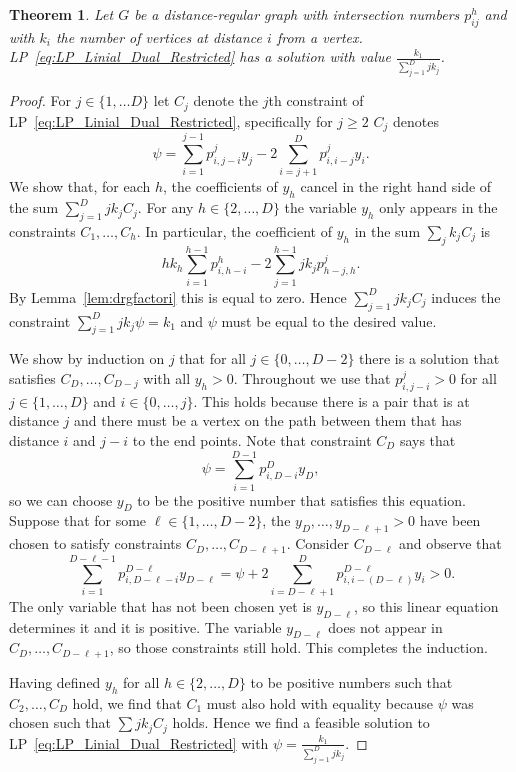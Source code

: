 \documentclass[a4paper,11pt]{article}
\newtheorem{theorem}{Theorem}[section]
\theoremstyle{definition}
\begin{document}
\begin{theorem}\label{thm:opt_lp_drg}
    Let $G$ be a distance-regular graph with intersection numbers $p_{ij}^h$ and with $k_i$ the number of vertices at distance $i$ from a vertex. LP~\eqref{eq:LP_Linial_Dual_Restricted} has a solution with value $\frac{k_1}{\sum_{j=1}^D jk_j}$.
\end{theorem}

\begin{proof}
    For $j \in \{1,\ldots D\}$ let $C_j$ denote the $j$th constraint of LP~\eqref{eq:LP_Linial_Dual_Restricted}, specifically for $j  \ge 2$ $C_j$ denotes
    $$\psi = \sum_{i=1}^{j-1} p_{i,j-i}^j y_j -2 \sum_{i=j+1}^{D} p_{i,i-j}^j y_i.$$
    We show that, for each $h$, the coefficients of $y_h$ cancel in the right hand side of the sum $\sum_{j = 1}^D jk_jC_j$. For any $h \in \{2,\ldots, D\}$ the variable $y_h$ only appears in the constraints $C_1,\ldots, C_h$. In particular, the coefficient of $y_h$ in the sum $\sum_jk_j C_j$ is $$hk_h\sum_{i = 1}^{h-1} p_{i,h-i}^h - 2\sum_{j = 1}^{h-1} jk_jp_{h-j,h}^j.$$ By Lemma~\ref{lem:drgfactori} this is equal to zero.  Hence $\sum_{j = 1}^D jk_jC_j$ induces the constraint $\sum_{j = 1}^D jk_j\psi = k_1$ and $\psi$ must be equal to the desired value. 
    
    We show by induction on $j$ that for all $j\in\{0,\dots,D-2\}$ there is a solution that satisfies $C_D,\ldots, C_{D-j}$ with all $y_h > 0$. Throughout we use that $p_{i,j-i}^j > 0$ for all \(j\in\{1,\dots,D\}\) and $i\in\{0,\dots,j\}$. This holds because there is a pair that is at distance $j$ and there must be a vertex on the path between them that has distance $i$ and $j-i$ to the end points. Note that constraint $C_D$ says that
    $$\psi = \sum_{i = 1}^{D-1} p_{i,D-i}^Dy_D,$$
    so we can choose $y_D$ to be the positive number that satisfies this equation. Suppose that for some $\ell\in\{1,\dots,D-2\}$, the $y_D,\ldots, y_{D-\ell+1} > 0$ have been chosen to satisfy constraints $C_D,\ldots, C_{D-\ell+1}$. Consider $C_{D-\ell}$ and observe that
    $$\sum_{i = 1}^{D-\ell-1} p_{i,D-\ell-i}^{D-\ell} y_{D-\ell} = \psi + 2\sum_{i = D-\ell+1}^Dp_{i,i-(D-\ell)}^{D-\ell}y_i > 0.$$
    The only variable that has not been chosen yet is $y_{D-\ell}$, so this linear equation determines it and it is positive. The variable $y_{D-\ell}$ does not appear in $C_D, \ldots, C_{D-\ell +1}$, so those constraints still hold. This completes the induction.
    
    Having defined $y_h$ for all $h\in\{2,\dots,D\}$ to be positive numbers such that $C_2,\ldots, C_D$ hold, we find that $C_1$ must also hold with equality because $\psi$ was chosen such that $\sum jk_jC_j$ holds. Hence we find a feasible solution to LP~\eqref{eq:LP_Linial_Dual_Restricted} with $\psi  = \frac{k_1}{\sum_{j = 1}^D jk_j}$.
\end{proof}
\end{document}
